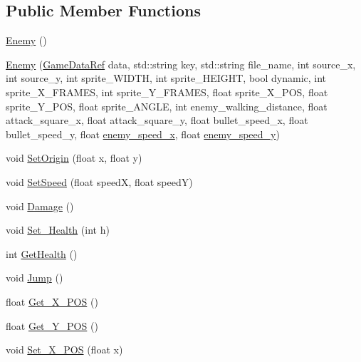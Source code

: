 \subsection*{Public Member Functions}
\begin{DoxyCompactItemize}
\item 
\hyperlink{classSekander_1_1Enemy_af9081f1217d2f9b122eaa77361139be9}{Enemy} ()
\item 
\hyperlink{classSekander_1_1Enemy_aa5be2d2f7c44b05ed64686363b465bab}{Enemy} (\hyperlink{namespaceSekander_a1d69b002ba2d23020901c28f0def5e16}{Game\+Data\+Ref} data, std\+::string key, std\+::string file\+\_\+name, int source\+\_\+x, int source\+\_\+y, int sprite\+\_\+\+W\+I\+D\+TH, int sprite\+\_\+\+H\+E\+I\+G\+HT, bool dynamic, int sprite\+\_\+\+X\+\_\+\+F\+R\+A\+M\+ES, int sprite\+\_\+\+Y\+\_\+\+F\+R\+A\+M\+ES, float sprite\+\_\+\+X\+\_\+\+P\+OS, float sprite\+\_\+\+Y\+\_\+\+P\+OS, float sprite\+\_\+\+A\+N\+G\+LE, int enemy\+\_\+walking\+\_\+distance, float attack\+\_\+square\+\_\+x, float attack\+\_\+square\+\_\+y, float bullet\+\_\+speed\+\_\+x, float bullet\+\_\+speed\+\_\+y, float \hyperlink{classSekander_1_1Enemy_ad3dc624095323fabfb2be9e4805afd24}{enemy\+\_\+speed\+\_\+x}, float \hyperlink{classSekander_1_1Enemy_a0f04d6bca363cdfcac06832f3de87aaa}{enemy\+\_\+speed\+\_\+y})
\item 
void \hyperlink{classSekander_1_1Enemy_adc8510b9f333718163e4f319cfc9a2f1}{Set\+Origin} (float x, float y)
\item 
void \hyperlink{classSekander_1_1Enemy_a140204b200a98b84fd51bd63d621cfec}{Set\+Speed} (float speedX, float speedY)
\item 
void \hyperlink{classSekander_1_1Enemy_a110643efd2b4f89e00c66ddfd447361a}{Damage} ()
\item 
void \hyperlink{classSekander_1_1Enemy_ae788a59ac3cef89141f7c961ff37489d}{Set\+\_\+\+Health} (int h)
\item 
int \hyperlink{classSekander_1_1Enemy_abfcf9b9d10c3b0306bc761b4c582e51c}{Get\+Health} ()
\item 
void \hyperlink{classSekander_1_1Enemy_a8f28e7a9f1fa9f039ea780e741683f14}{Jump} ()
\item 
float \hyperlink{classSekander_1_1Enemy_a81ee82bd48b940bb2f9533c039af03c2}{Get\+\_\+\+X\+\_\+\+P\+OS} ()
\item 
float \hyperlink{classSekander_1_1Enemy_a437363f7582bf66f03e8502c9e30e6af}{Get\+\_\+\+Y\+\_\+\+P\+OS} ()
\item 
void \hyperlink{classSekander_1_1Enemy_a1e830bd6c9ff60a6b794fbc0f828b357}{Set\+\_\+\+X\+\_\+\+P\+OS} (float x)

\end{DoxyCompactItemize}
